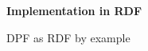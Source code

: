 \documentclass[dvips,slidetop,mathserif,brown]{beamer}
\begin{document}
\begin{frame}{}
  \begin{center}
    \begin{Huge}
      \textbf{Implementation in RDF}
    \end{Huge}
  \end{center}
\end{frame}

\begin{frame}[t]{DPF as RDF by example}
\end{frame}
\end{document}
